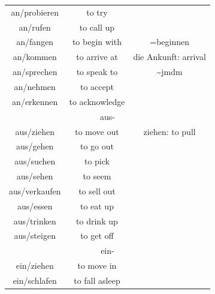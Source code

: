 \begin{center}
\begin{longtable} {|c|c|c|}
        an/probieren    & to try                    &                                             \\
        an/rufen        & to call up                &                                             \\
        an/fangen       & to begin with             & =beginnen                                   \\
        an/kommen       & to arrive at              & die Ankunft: arrival                        \\
        an/sprechen     & to speak to               & \textasciitilde jmdm                        \\
        an/nehmen       & to accept                 &                                             \\
        an/erkennen     & to acknowledge            &                                             \\
        \hline
        \multicolumn{3}{|c|}{aus-}                                                                \\
        \hline
        aus/ziehen      & to move out               & ziehen: to pull                             \\
        aus/gehen       & to go out                 &                                             \\
        aus/suchen      & to pick                   &                                             \\
        aus/sehen       & to seem                   &                                             \\
        aus/verkaufen   & to sell out               &                                             \\
        aus/essen       & to eat up                 &                                             \\
        aus/trinken     & to drink up               &                                             \\
        aus/steigen     & to get off                &                                             \\
        \hline
        \multicolumn{3}{|c|}{ein-}                                                                \\
        \hline
        ein/ziehen      & to move in                &                                             \\
        ein/schlafen    & to fall asleep            &                                             \\

\end{longtable}
\end{center}
